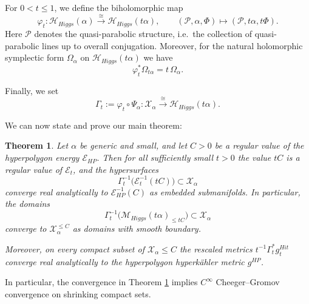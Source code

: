 \documentclass[12pt,a4paper]{amsart}
\newtheorem{theorem}{Theorem}[section]
\theoremstyle{definition}
\theoremstyle{remark}
\begin{document}
For $0<t\leq1$, we define the biholomorphic map
\[
\varphi_t\colon
\mathcal H_{Higgs}(\alpha)
\xrightarrow{\;\cong\;}
\mathcal H_{Higgs}(t\alpha),
\qquad
(\mathcal P,\alpha,\Phi)\longmapsto (\mathcal P,t\alpha,t\Phi).
\]
Here $\mathcal P$ denotes the quasi-parabolic structure, i.e.\ the collection of
quasi-parabolic lines up to overall conjugation.
Moreover, for the natural holomorphic symplectic form $\Omega_\alpha$ on
$\mathcal H_{Higgs}(t\alpha)$ we have
\[
\varphi_t^*\Omega_{t\alpha}=t\,\Omega_{\alpha}.
\]

Finally, we set
\[
\Gamma_t
:=
\varphi_t\circ\Psi_\alpha
\colon
\mathcal X_\alpha
\xrightarrow{\;\cong\;}
\mathcal H_{Higgs}(t\alpha).
\]




We can now state and prove our main theorem:
\begin{theorem}\label{thm:semiclassical-hitchin-metric-low-energy-regular}
Let $\alpha$ be generic and small, and let $C>0$ be a regular value of the hyperpolygon energy
$\mathcal E_{HP}$.
Then for all sufficiently small $t>0$ the value $t C$ is a regular value of
$\mathcal E_t$, and the hypersurfaces
\[
\Gamma_t^{-1}\!\bigl(\mathcal E_t^{-1}(t C)\bigr)\subset \mathcal X_\alpha
\]
converge real analytically to $\mathcal E_{HP}^{-1}(C)$ as embedded submanifolds.
In particular, the domains
\[
\Gamma_t^{-1}\bigl(\mathcal M_{Higgs}(t\alpha)_{\le t C}\bigr)
\subset \mathcal X_\alpha
\]
converge to $\mathcal X_\alpha^{\le C}$  as domains with smooth boundary.

Moreover, on every compact subset of $\mathcal X_\alpha{\le C}$ the rescaled metrics
$t^{-1}\Gamma_t^* g^{Hit}_t$ converge real analytically to the hyperpolygon hyperk\"ahler
metric $g^{HP}$. 
\end{theorem}
In particular, the convergence in Theorem \ref{thm:semiclassical-hitchin-metric-low-energy-regular} implies
$C^\infty$ Cheeger--Gromov convergence \cite{ChGr} on  shrinking compact sets.
\end{document}
